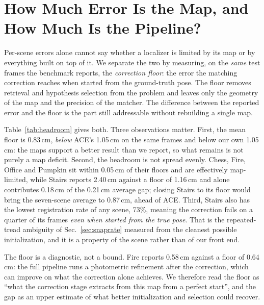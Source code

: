\documentclass[journal]{IEEEtran}
\begin{document}
\section{How Much Error Is the Map, and How Much Is the Pipeline?}
\label{sec:headroom}
Per-scene errors alone cannot say whether a localizer is limited by its map
or by everything built on top of it. We separate the two by measuring, on
the \emph{same} test frames the benchmark reports, the \emph{correction
floor}: the error the matching correction reaches when started from the
ground-truth pose. The floor removes retrieval and hypothesis selection from
the problem and leaves only the geometry of the map and the precision of the
matcher. The difference between the reported error and the floor is the part
still addressable without rebuilding a single map.

Table~\ref{tab:headroom} gives both. Three observations matter. First, the mean floor is 0.83\,cm, \emph{below} ACE's 1.05\,cm on the same frames and below our own 1.05\,cm: the maps support a better result than we report, so what remains is not purely a map deficit. Second,
the headroom is not spread evenly. Chess, Fire, Office and Pumpkin sit within 0.05\,cm of their floors and are effectively map-limited, while Stairs reports 2.40\,cm against a floor of 1.16\,cm and alone contributes 0.18\,cm of the 0.21\,cm average gap; closing Stairs to its floor would bring the seven-scene average to 0.87\,cm, ahead of ACE. Third, Stairs also has the
lowest registration rate of any scene, 73\%, meaning the correction fails on
a quarter of its frames \emph{even when started from the true pose}. That is
the repeated-tread ambiguity of Sec.~\ref{sec:snaprate} measured from the
cleanest possible initialization, and it is a property of the scene rather
than of our front end.

The floor is a diagnostic, not a bound. Fire reports 0.58\,cm against a
floor of 0.64\,cm: the full pipeline runs a photometric refinement after the
correction, which can improve on what the correction alone achieves. We
therefore read the floor as ``what the correction stage extracts from this
map from a perfect start'', and the gap as an upper estimate of what better
initialization and selection could recover.
\end{document}
